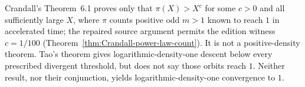 













\begin{nonclaim}
Crandall's Theorem~6.1 proves only that
$\pi(X)>X^c$ for some $c>0$ and all sufficiently large $X$, where $\pi$
counts positive odd $m>1$ known to reach $1$ in accelerated time; the
repaired source argument permits the edition witness $c=1/100$
(Theorem~\ref{thm:Crandall-power-law-count}).  It is not a positive-density
theorem.  Tao's
theorem gives logarithmic-density-one descent below every prescribed
divergent threshold, but does not say those orbits reach $1$.  Neither result,
nor their conjunction, yields logarithmic-density-one convergence to $1$.
\end{nonclaim}
